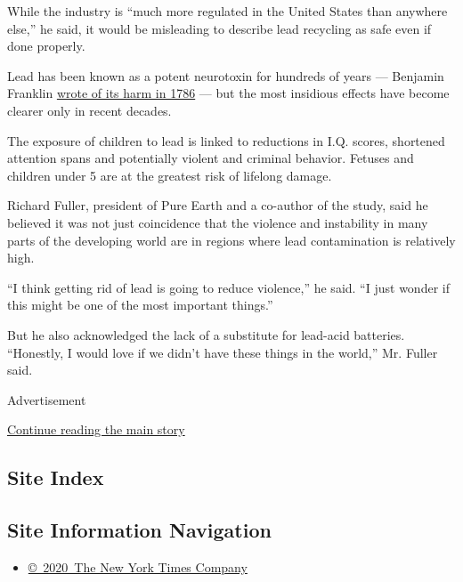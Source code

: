 While the industry is ``much more regulated in the United States than
anywhere else,'' he said, it would be misleading to describe lead
recycling as safe even if done properly.

Lead has been known as a potent neurotoxin for hundreds of years ---
Benjamin Franklin
\href{http://environmentaleducation.com/wp-content/uploads/userfiles/Ben\%20Franklin\%20Letter\%20on\%20EEA(1).pdf}{wrote
of its harm in 1786} --- but the most insidious effects have become
clearer only in recent decades.

The exposure of children to lead is linked to reductions in I.Q. scores,
shortened attention spans and potentially violent and criminal behavior.
Fetuses and children under 5 are at the greatest risk of lifelong
damage.

Richard Fuller, president of Pure Earth and a co-author of the study,
said he believed it was not just coincidence that the violence and
instability in many parts of the developing world are in regions where
lead contamination is relatively high.

``I think getting rid of lead is going to reduce violence,'' he said.
``I just wonder if this might be one of the most important things.''

But he also acknowledged the lack of a substitute for lead-acid
batteries. ``Honestly, I would love if we didn't have these things in
the world,'' Mr. Fuller said.

Advertisement

\protect\hyperlink{after-bottom}{Continue reading the main story}

\hypertarget{site-index}{%
\subsection{Site Index}\label{site-index}}

\hypertarget{site-information-navigation}{%
\subsection{Site Information
Navigation}\label{site-information-navigation}}

\begin{itemize}
\tightlist
\item
  \href{https://help.nytimes3xbfgragh.onion/hc/en-us/articles/115014792127-Copyright-notice}{©~2020~The
  New York Times Company}
\end{itemize}

